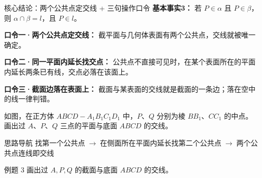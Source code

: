 \documentclass{exam-zh}
\begin{document}
\begin{eduSolutionBox}{核心结论：两个公共点定交线 + 三句操作口令}
  \begingroup
  \setlength{\parskip}{2.5mm}
\textbf{基本事实3：} 若 $P\in\alpha$ 且 $P\in\beta$，则 $\alpha\cap\beta=l$，且 $P\in l$。\par
\textbf{口令一·两个公共点定交线：} 截平面与几何体表面有两个公共点，交线就被唯一确定。\par
\textbf{口令二·同一平面内延长找交点：} 公共点不直接可见时，在某个表面所在的平面内延长两条已有线，交点必落在该面上。\par
\textbf{口令三·截面边落在表面上：} 截面与某表面的交线就是截面的一条边；落在空中的线一律判错。\par
  \endgroup
\end{eduSolutionBox}




\begin{eduProblemBlock}[例题 3]
如图，在正方体 $ABCD-A_1B_1C_1D_1$ 中，$P$、$Q$ 分别为棱 $BB_1$、$CC_1$ 的中点。
画出过 $A$、$P$、$Q$ 三点的平面与底面 $ABCD$ 的交线。

\end{eduProblemBlock}





\begin{eduAuxItem}{思路导航}
找第一个公共点$\;\to\;$在侧面所在平面内延长找第二个公共点$\;\to\;$两个公共点连线即交线\end{eduAuxItem}




\begin{eduSubQuestionItem}{例题 3}
画出过 $A,P,Q$ 的截面与底面 $ABCD$ 的交线。\end{eduSubQuestionItem}
\end{document}
